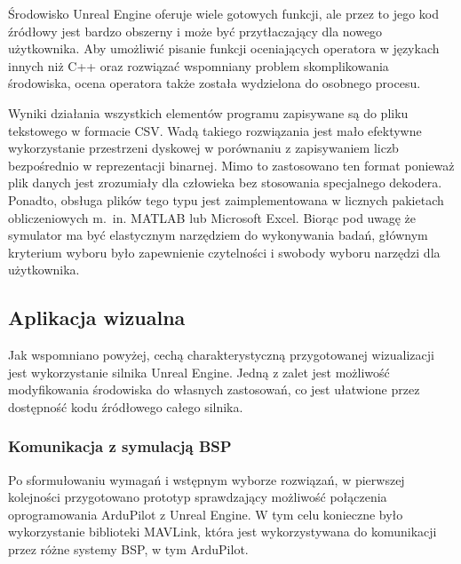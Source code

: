 Środowisko Unreal Engine oferuje wiele gotowych funkcji, ale przez to jego kod źródłowy jest bardzo obszerny i może być przytłaczający dla nowego użytkownika. Aby umożliwić pisanie funkcji oceniających operatora w językach innych niż C++ oraz rozwiązać wspomniany problem skomplikowania środowiska, ocena operatora także została wydzielona do osobnego procesu.

Wyniki działania wszystkich elementów programu zapisywane są do pliku tekstowego w formacie CSV\cite{rfc4180}. Wadą takiego rozwiązania jest mało efektywne wykorzystanie przestrzeni dyskowej w porównaniu z zapisywaniem liczb bezpośrednio w reprezentacji binarnej. Mimo to zastosowano ten format ponieważ plik danych jest zrozumiały dla człowieka bez stosowania specjalnego dekodera. Ponadto, obsługa plików tego typu jest zaimplementowana w licznych pakietach obliczeniowych m.~in. MATLAB lub Microsoft Excel. Biorąc pod uwagę że symulator ma być elastycznym narzędziem do wykonywania badań, głównym kryterium wyboru było zapewnienie czytelności i swobody wyboru narzędzi dla użytkownika.

\subsection{Aplikacja wizualna}

Jak wspomniano powyżej, cechą charakterystyczną przygotowanej wizualizacji jest wykorzystanie silnika Unreal Engine. Jedną z zalet jest możliwość modyfikowania środowiska do własnych zastosowań, co jest ułatwione przez dostępność kodu źródłowego całego silnika.

\subsubsection{Komunikacja z symulacją BSP}
\label{sec:komunikacja}

Po sformułowaniu wymagań i wstępnym wyborze rozwiązań, w pierwszej kolejności przygotowano prototyp sprawdzający możliwość połączenia oprogramowania ArduPilot z Unreal Engine. W tym celu konieczne było wykorzystanie biblioteki MAVLink\cite{soft:mavlink}, która jest wykorzystywana do komunikacji przez różne systemy BSP, w tym ArduPilot.

